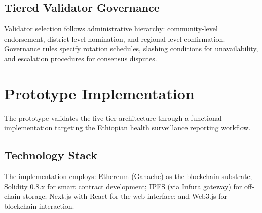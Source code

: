 \documentclass[AMA,LATO1COL]{WileyNJDv5}
\begin{document}
\subsection{Tiered Validator Governance}

Validator selection follows administrative hierarchy: community-level endorsement, district-level nomination, and regional-level confirmation. Governance rules specify rotation schedules, slashing conditions for unavailability, and escalation procedures for consensus disputes.


\section{Prototype Implementation}\label{sec:implementation}

The prototype validates the five-tier architecture through a functional implementation targeting the Ethiopian health surveillance reporting workflow.

\subsection{Technology Stack}

The implementation employs: Ethereum (Ganache) as the blockchain substrate; Solidity 0.8.x for smart contract development; IPFS (via Infura gateway) for off-chain storage; Next.js with React for the web interface; and Web3.js for blockchain interaction.
\end{document}
